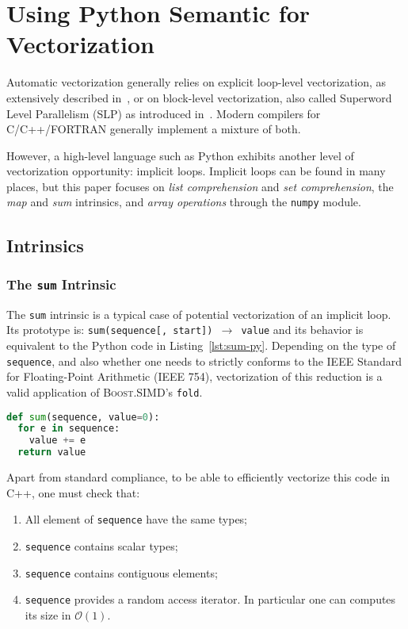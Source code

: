 \documentclass[preprint]{sigplanconf}
\providecommand{\boostsimd}{\textsc{Boost.SIMD}}
\begin{document}
\section{Using Python Semantic for Vectorization}
\label{sec:python-semantic}

Automatic vectorization generally relies on explicit loop-level vectorization, as
extensively described in~\cite{bik04}, or on block-level vectorization, also
called Superword Level Parallelism (SLP) as introduced in~\cite{larsen00}.
Modern compilers for C/C++/FORTRAN generally implement a mixture of both.

However, a high-level language such as Python exhibits another level of
vectorization opportunity: implicit loops. Implicit loops can be found in many
places, but this paper focuses on \emph{list comprehension} and \emph{set
comprehension}, the \emph{map} and \emph{sum} intrinsics, and \emph{array
operations} through the \texttt{numpy} module.

\subsection{Intrinsics}

\subsubsection{The \texttt{sum} Intrinsic}

The \texttt{sum} intrinsic is a typical case of potential vectorization of an
implicit loop. Its prototype is: \texttt{sum(sequence[, start]) $\rightarrow$
value} and its behavior is equivalent to the Python code in
Listing~\ref{lst:sum-py}. Depending on the type of \texttt{sequence}, and also
whether one needs to strictly conforms to the IEEE Standard for Floating-Point
Arithmetic (IEEE 754), vectorization of this reduction is a valid application
of \boostsimd's \texttt{fold}.

\begin{lstlisting}[language=python, label={lst:sum-py}, caption={Pseudo code of the \texttt{sum} intrinsic.}]
def sum(sequence, value=0):
  for e in sequence:
    value += e
  return value
\end{lstlisting}

Apart from standard compliance, to be able to efficiently vectorize this code in C++, one must check that:

\begin{enumerate}
    \item\label{enu:same-types} All element of \texttt{sequence} have the same types;
    \item\label{enu:scalar-types} \texttt{sequence} contains scalar types;
    \item\label{enu:contiguous} \texttt{sequence} contains contiguous elements;
    \item\label{enu:random-access} \texttt{sequence} provides a random access iterator. In particular one can computes its size in $\mathcal{O}(1)$.
\end{enumerate}
\end{document}
